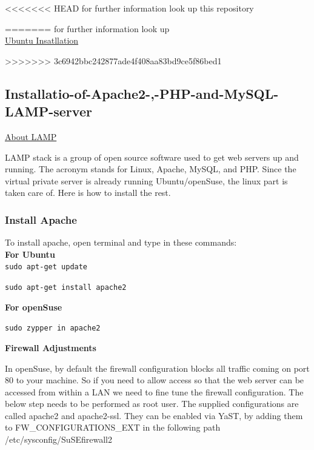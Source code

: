\documentclass[16pt]{article}
\begin{document}
<<<<<<< HEAD
for further information look up this repository 
  
\hfill

=======
for further information look up \\

\href{https://help.ubuntu.com/community/WindowsDualBoot}{Ubuntu Insatllation}
  
\hfill
>>>>>>> 3c6942bbc242877ade4f408aa83bd9ce5f86bed1


\subsection{Installatio-of-Apache2-,-PHP-and-MySQL-LAMP-server}

\vspace{0.5cm}

{\underline{\Large{About LAMP}}}

  LAMP stack is a group of open source software used to get web servers up
  and running. The acronym stands for Linux, Apache, MySQL, and PHP. Since
  the virtual private server is already running Ubuntu/openSuse, the linux
  part is taken care of. Here is how to install the rest.


  
  

  

  \subsubsection{Install Apache}
  
  \hfill

  To install apache, open terminal and type in these commands: \\
  \textbf{For Ubuntu} \\
  \texttt{sudo apt-get update} 

  \texttt{sudo apt-get install apache2}

  \textbf{For openSuse}

  \texttt{sudo zypper in apache2}

  \textbf{Firewall Adjustments}

  In openSuse, by default the firewall configuration blocks all traffic
  coming on port 80 to your machine. So if you need to allow access so
  that the web server can be accessed from within a LAN we need to fine
  tune the firewall configuration. The below step needs to be performed as
  root user. The supplied configurations are called apache2 and
  apache2-ssl. They can be enabled via YaST, by adding them to
  FW\_CONFIGURATIONS\_EXT in the following path /etc/sysconfig/SuSEfirewall2
  
\end{document}
